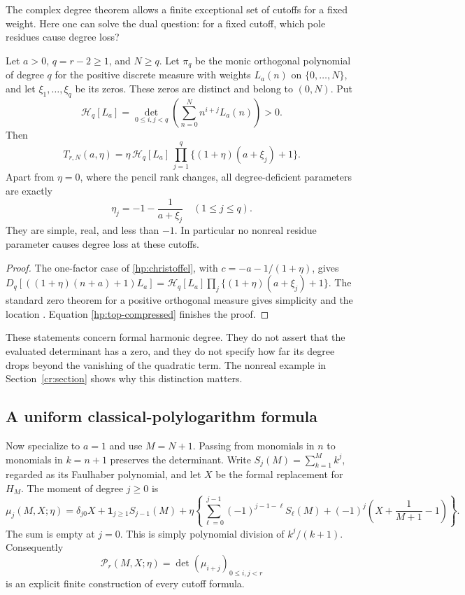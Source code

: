 The complex degree theorem allows a finite exceptional set of
cutoffs for a fixed weight. Here one can solve the dual question:
for a fixed cutoff, which pole residues cause degree loss?

\begin{corollary}\label{hp:roots}
Let $a>0$, $q=r-2\ge1$, and $N\ge q$. Let $\pi_q$ be the monic
orthogonal polynomial of degree $q$ for the positive discrete
measure with weights $L_a(n)$ on $\{0,\ldots,N\}$, and let
$\xi_1,\ldots,\xi_q$ be its zeros. These zeros are distinct and
belong to $(0,N)$. Put
\[
 \mathcal H_q[L_a]=
 \det_{0\le i,j<q}\left(\sum_{n=0}^N n^{i+j}L_a(n)\right)>0.
\]
Then
\begin{equation}\label{hp:root-factorization}
 T_{r,N}(a,\eta)
  =\eta\,\mathcal H_q[L_a]\,
         \prod_{j=1}^q\{(1+\eta)(a+\xi_j)+1\}.
\end{equation}
Apart from $\eta=0$, where the pencil rank changes, all
degree-deficient parameters are exactly
\begin{equation}\label{hp:exceptional}
             \eta_j=-1-\frac1{a+\xi_j}\quad(1\le j\le q).
\end{equation}
They are simple, real, and less than $-1$. In particular no
nonreal residue parameter causes degree loss at these cutoffs.
\end{corollary}
\begin{proof}
The one-factor case of \eqref{hp:christoffel}, with
$c=-a-1/(1+\eta)$, gives
$D_q[((1+\eta)(n+a)+1)L_a]
=\mathcal H_q[L_a]\prod_j\{(1+\eta)(a+\xi_j)+1\}$.
The standard zero theorem for a positive orthogonal measure
gives simplicity and the location \cite[Section 18.2(vi)]{DLMF}.
Equation \eqref{hp:top-compressed} finishes the proof.
\end{proof}

These statements concern formal harmonic degree. They do not
assert that the evaluated determinant has a zero, and they do
not specify how far its degree drops beyond the vanishing of
the quadratic term. The nonreal example in
Section~\ref{cr:section} shows why this distinction matters.

\subsection{A uniform classical-polylogarithm formula}

Now specialize to $a=1$ and use $M=N+1$. Passing from monomials
in $n$ to monomials in $k=n+1$ preserves the determinant. Write
$S_j(M)=\sum_{k=1}^M k^j$, regarded as its Faulhaber polynomial,
and let $X$ be the formal replacement for $H_M$. The moment of
degree $j\ge0$ is
\begin{equation}\label{hp:compiler}
 \mu_j(M,X;\eta)=
 \delta_{j0}X+\mathbf1_{j\ge1}S_{j-1}(M)
 +\eta\left\{
   \sum_{\ell=0}^{j-1}(-1)^{j-1-\ell}S_\ell(M)
   +(-1)^j\left(X+\frac1{M+1}-1\right)\right\}.
\end{equation}
The sum is empty at $j=0$. This is simply polynomial division
of $k^j/(k+1)$. Consequently
\[
 \mathcal P_r(M,X;\eta)=\det(\mu_{i+j})_{0\le i,j<r}
\]
is an explicit finite construction of every cutoff formula.

